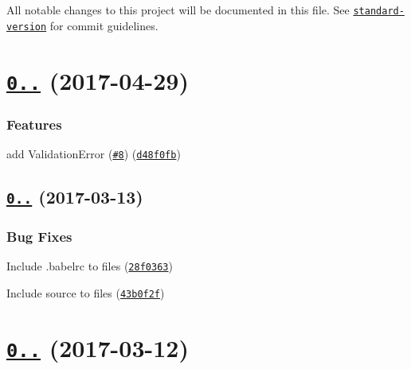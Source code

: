 All notable changes to this project will be documented in this file. See \href{https://github.com/conventional-changelog/standard-version}{\tt standard-\/version} for commit guidelines.

\label{_0.3.0}%
 \section*{\href{https://github.com/webpack-contrib/schema-utils/compare/v0.2.1...v0.3.0}{\tt 0..} (2017-\/04-\/29)}

\subsubsection*{Features}


\begin{DoxyItemize}
\item add Validation\+Error (\href{https://github.com/webpack-contrib/schema-utils/issues/8}{\tt \#8}) (\href{https://github.com/webpack-contrib/schema-utils/commit/d48f0fb}{\tt d48f0fb})
\end{DoxyItemize}

\label{_0.2.1}%
 \subsection*{\href{https://github.com/webpack-contrib/schema-utils/compare/v0.2.0...v0.2.1}{\tt 0..} (2017-\/03-\/13)}

\subsubsection*{Bug Fixes}


\begin{DoxyItemize}
\item Include .babelrc to {\ttfamily files} (\href{https://github.com/webpack-contrib/schema-utils/commit/28f0363}{\tt 28f0363})
\item Include source to {\ttfamily files} (\href{https://github.com/webpack-contrib/schema-utils/commit/43b0f2f}{\tt 43b0f2f})
\end{DoxyItemize}

\label{_0.2.0}%
 \section*{\href{https://github.com/webpack-contrib/schema-utils/compare/v0.1.0...v0.2.0}{\tt 0..} (2017-\/03-\/12)}

\label{_0.1.0}%
